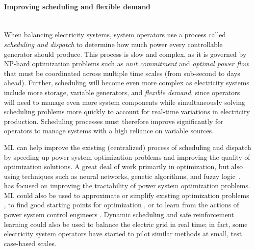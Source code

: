 \documentclass[11pt]{report}
\begin{document}
\paragraph{Improving scheduling and flexible demand}\mbox{}\\\label{sec:dispatchDR}When balancing electricity systems, system operators use a process called
\emph{scheduling and dispatch} to determine how much power every controllable generator should produce. This process is slow and complex, as it is governed by NP-hard optimization problems such as \emph{unit commitment} and \emph{optimal power flow} that must be coordinated across multiple time scales (from sub-second to days ahead). 
Further, scheduling will become even more complex as electricity systems include more storage, variable generators, and \emph{flexible demand}, since operators will need to manage even more system components while simultaneously solving scheduling problems more quickly to account for real-time variations in electricity production. Scheduling processes must therefore improve significantly for operators to manage systems with a high reliance on variable sources.

ML can help improve the existing (centralized) process of scheduling and dispatch by speeding up power system optimization problems and improving the quality of optimization solutions. A great deal of work primarily in optimization, but also using techniques such as neural networks, genetic algorithms, and fuzzy logic~\cite{pandya2008survey}, has focused on improving the tractability of power system optimization problems. ML could also be used to approximate or simplify existing optimization problems \cite{guha2019machine, bertsimas2019online, zamzam2019learning}, to find good starting points for optimization \cite{jamei2019meta}, or to learn from the actions of power system control engineers \cite{donnot2017introducing}.
Dynamic scheduling \cite{essl2017machine, moehle2019dynamic} and safe reinforcement learning could also be used to balance the electric grid in real time; in fact, some electricity system operators have started to pilot similar methods at small, test case-based scales. 
\end{document}
